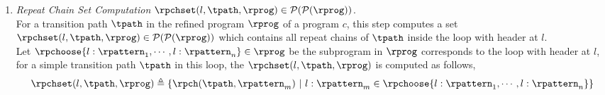 \begin{enumerate}
\begin{enumerate}
%
\item 
\emph{Repeat Chain Set Computation}
$\rpchset(l, \tpath, \rprog) \in \mathcal{P}(\mathcal{P}(\rprog))$.
\\
For a transition path $\tpath$ in the refined program $\rprog$ of a program $c$, 
this step computes a set 
$\rpchset(l, \tpath, \rprog) \in \mathcal{P}(\mathcal{P}(\rprog))$
which contains
 all repeat chains of $\tpath$ inside the loop with header at $l$.
 \\
Let $\rpchoose{l: \rpattern_1, \cdots, l: \rpattern_n}  \in \rprog$
be the subprogram in $\rprog$ corresponds to the  loop with header at $l$, for a simple transition path $\tpath$ in this loop,
the $\rpchset(l, \tpath, \rprog)$ is computed as follows,
 \[
    \rpchset(l, \tpath, \rprog) \triangleq \left\{\rpch(\tpath, \rpattern_m)
    ~\middle\vert~
    l : \rpattern_m \in \rpchoose{l: \rpattern_1, \cdots, l: \rpattern_n} 
    \right\}
 \]
%
  

\end{enumerate}
\end{enumerate}
